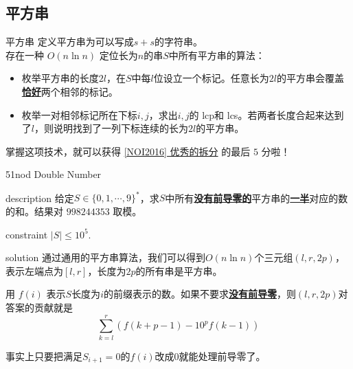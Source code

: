 \documentclass{beamer}
\theoremstyle{compact}
\def\obj#1{\textbf{\uline{#1}}}
\def\le{\leqslant}
\def\lcp{\textrm{lcp}}
\def\lcs{\textrm{lcs}}
\begin{document}
\subsection{平方串}
\begin{frame}{平方串}
	定义平方串为可以写成$s+s$的字符串。\\

	存在一种 $O(n \ln n)$ 定位长为$n$的串$S$中所有平方串的算法：
	\begin{itemize}
		\item 枚举平方串的长度$2l$，在$S$中每$l$位设立一个标记。任意长为$2l$的平方串会覆盖\obj{恰好}两个相邻的标记。
		\item 枚举一对相邻标记所在下标$i, j$，求出$i, j$的 \lcp 和 \lcs 。若两者长度合起来达到了$l$，则说明找到了一列下标连续的长为$2l$的平方串。
	\end{itemize}

	掌握这项技术，就可以获得 \href{https://www.luogu.com.cn/problem/P1117}{ [NOI2016] 优秀的拆分} 的最后 $5$ 分啦！
\end{frame}
\begin{frame}{51nod Double Number}
	\begin{block}{description}
	给定$S \in \{0, 1, \cdots, 9\}^*$，求$S$中所有\obj{没有前导零的}平方串的\obj{一半}对应的数的和。结果对 $998244353$ 取模。
	\end{block}
	\begin{block}{constraint}
	$|S| \le 10^5.$
	\end{block}
\pause
\begin{block}{solution}
	通过通用的平方串算法，我们可以得到$O(n \ln n)$个三元组$(l, r, 2p)$，表示左端点为$[l, r]$，长度为$2p$的所有串是平方串。

	用 $f(i)$ 表示$S$长度为$i$的前缀表示的数。如果不要求\obj{没有前导零}，则$(l, r, 2p)$对答案的贡献就是$$\sum_{k=l}^{r}\left(f(k+p-1) - 10^p f(k-1)\right)$$

	事实上只要把满足$S_{i+1} = 0$的$f(i)$改成$0$就能处理前导零了。
\end{block}
\end{frame}
\end{document}
